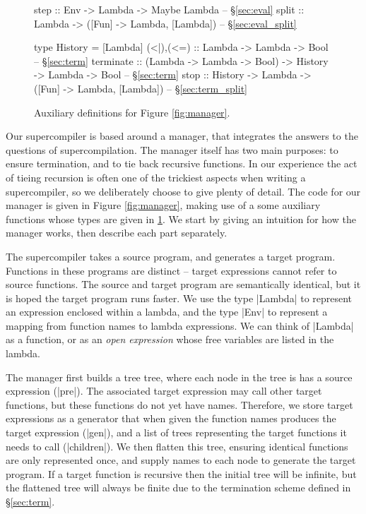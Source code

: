 \documentclass[draft]{sigplanconf}
\begin{document}
\begin{figure}
\begin{code}
step :: Env -> Lambda -> Maybe Lambda -- \S\ref{sec:eval}
split :: Lambda -> ([Fun] -> Lambda, [Lambda]) -- \S\ref{sec:eval_split}

type History = [Lambda]
(<|),(<=) :: Lambda -> Lambda -> Bool -- \S\ref{sec:term}
terminate  :: (Lambda -> Lambda -> Bool)
           -> History -> Lambda -> Bool -- \S\ref{sec:term}
stop :: History -> Lambda -> ([Fun] -> Lambda, [Lambda])
    -- \S\ref{sec:term_split}
\end{code}
\caption{Auxiliary definitions for Figure \ref{fig:manager}.}
\label{fig:manager2}
\end{figure}

Our supercompiler is based around a manager, that integrates the answers to the questions of supercompilation. The manager itself has two main purposes: to ensure termination, and to tie back recursive functions. In our experience the act of tieing recursion is often one of the trickiest aspects when writing a supercompiler, so we deliberately choose to give plenty of detail. The code for our manager is given in Figure \ref{fig:manager}, making use of a some auxiliary functions whose types are given in \ref{fig:manager2}. We start by giving an intuition for how the manager works, then describe each part separately.

The supercompiler takes a source program, and generates a target program. Functions in these programs are distinct -- target expressions cannot refer to source functions. The source and target program are semantically identical, but it is hoped the target program runs faster. We use the type |Lambda| to represent an expression enclosed within a lambda, and the type |Env| to represent a mapping from function names to lambda expressions. We can think of |Lambda| as a function, or as an \textit{open expression} whose free variables are listed in the lambda.

The manager first builds a tree tree, where each node in the tree is has a source expression (|pre|). The associated target expression may call other target functions, but these functions do not yet have names. Therefore, we store target expressions as a generator that when given the function names produces the target expression (|gen|), and a list of trees representing the target functions it needs to call (|children|). We then flatten this tree, ensuring identical functions are only represented once, and supply names to each node to generate the target program. If a target function is recursive then the initial tree will be infinite, but the flattened tree will always be finite due to the termination scheme defined in \S\ref{sec:term}.
\end{document}
